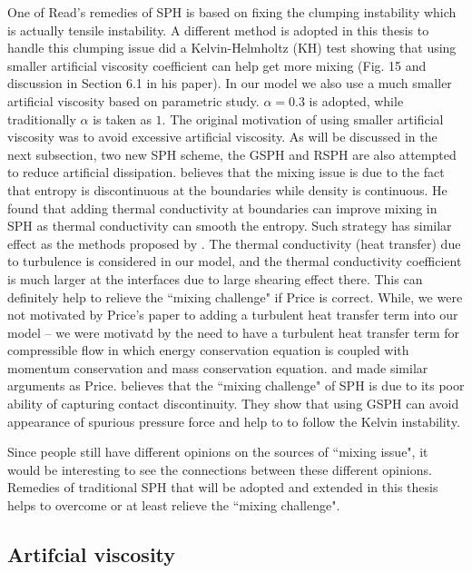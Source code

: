 One of Read's remedies of SPH is based on fixing the clumping instability which is actually tensile instability. A different method \citep{chen1999improvement} is adopted in this thesis to handle this clumping issue \citet{agertz2007fundamental} did a Kelvin-Helmholtz (KH) test showing that using smaller artificial viscosity coefficient can help get more mixing (Fig. 15 and discussion in Section 6.1 in his paper). In our model we also use a much smaller artificial viscosity based on parametric study. $\alpha =0.3$ is adopted, while traditionally $\alpha$ is taken as $1$. The original motivation of using smaller artificial viscosity was to avoid excessive artificial viscosity. As will be discussed in the next subsection, two new SPH scheme, the GSPH and RSPH are also attempted to reduce artificial dissipation. \citet{price2008modelling} believes that the mixing issue is due to the fact that entropy is discontinuous at the boundaries while density is continuous. He found that adding thermal conductivity at boundaries can improve mixing in SPH as thermal conductivity can smooth the entropy. Such strategy has similar effect as the methods proposed by \citet{read2010resolving}. The thermal conductivity (heat transfer) due to turbulence is considered in our model, and the thermal conductivity coefficient is much larger at the interfaces due to large shearing effect there. This can definitely help to relieve the ``mixing challenge" if Price is correct. While, we were not motivated by Price's paper to adding a turbulent heat transfer term into our model -- we were motivatd by the need to have a turbulent heat transfer term for compressible flow in which energy conservation equation is coupled with momentum conservation and mass conservation equation.
\citet{wadsley2008treatment} and \citet{ritchie2001multiphase} made similar arguments as Price. \citet{borgani2012hydrodynamic} believes that the ``mixing challenge" of SPH is due to its poor ability of capturing contact discontinuity. They show that using GSPH can avoid appearance of spurious pressure force and help to to follow the Kelvin instability.

Since people still have different opinions on the sources of ``mixing issue", it would be interesting to see the connections between these different opinions. Remedies of traditional SPH that will be adopted and extended in this thesis helps to overcome or at least relieve the ``mixing challenge".

\subsection{Artifcial viscosity}

